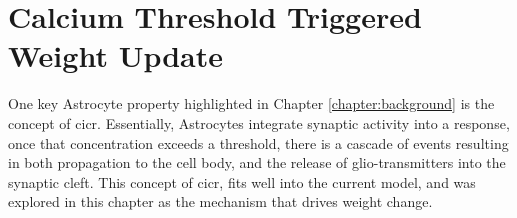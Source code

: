 

\section{Calcium Threshold Triggered Weight Update}
One key Astrocyte property highlighted in Chapter \ref{chapter:background} is
the concept of \Gls{cicr}. Essentially, Astrocytes integrate synaptic activity into a
\ca response, once that \ca concentration exceeds a threshold, there is a
cascade of events resulting in both \ca propagation to the cell body, and the
release of glio-transmitters into the synaptic cleft. This concept of \Gls{cicr}, fits
well into the current model, and was explored in this chapter as the
mechanism that drives weight change.


